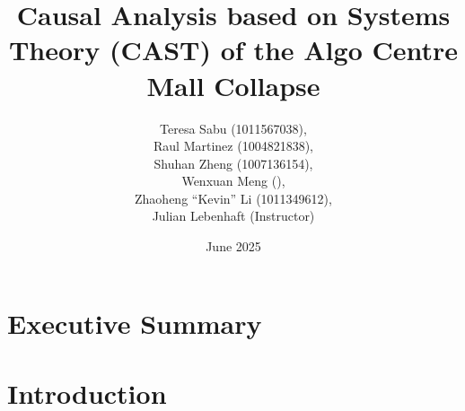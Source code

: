 \documentclass[12pt]{article}
\title{}
\date{June 2025}
\begin{document}
\title{Causal Analysis based on Systems Theory (CAST) of the Algo Centre Mall Collapse}
\author{Teresa Sabu (1011567038), \\
Raul Martinez (1004821838), \\
Shuhan Zheng (1007136154), \\
Wenxuan Meng (), \\
Zhaoheng ``Kevin'' Li (1011349612), \\
Julian Lebenhaft (Instructor)
}
\maketitle

\newpage



\tableofcontents
\newpage

\section*{Executive Summary}


\section{Introduction} 
\end{document}
